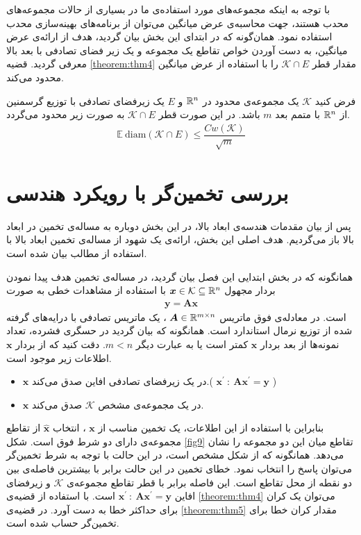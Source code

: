 با توجه به اینکه مجموعه‌های مورد استفاده‌ی ما در بسیاری از حالات مجموعه‌های محدب هستند، جهت محاسبه‌ی عرض میانگین می‌توان از برنامه‌های بهینه‌سازی محدب استفاده نمود.
همان‌گونه که در ابتدای این بخش بیان گردید، هدف از ارائه‌ی عرض میانگین، به دست آوردن خواص تقاطع یک مجموعه و یک زیر فضای تصادفی با بعد بالا معرفی گردید. قضیه
\ref{theorem:thm4}
مقدار قطر 
$\mathcal{K}\cap E$
را با استفاده از عرض میانگین محدود می‌کند.
\begin{theorem}
\label{theorem:thm4}
\cite[قضیه~3.12]{vershynin2015estimation}
فرض کنید 
$\mathcal{K}$
یک مجموعه‌ی محدود در
$\mathbb{R}^{n}$
و 
$E$
یک زیرفضای تصادفی با توزیع گرسمنین از
$\mathbb{R}^{n}$
با متمم بعد 
$m$
باشد. در این صورت قطر 
$\mathcal{K}\cap E$
به صورت زیر محدود می‌گردد.
\begin{align}
\label{eq:eq15}
\mathbb{E}~ \text{diam}\left( \mathcal{K}\cap E \right) \leq \dfrac{C w\left(\mathcal{K}\right)}{\sqrt{m} }
\end{align}

\end{theorem} 

\section{بررسی تخمین‌گر با رویکرد هندسی}
پس از بیان مقدمات هندسه‌ی ابعاد بالا، در این بخش دوباره به مساله‌ی تخمین در ابعاد بالا باز می‌گردیم. هدف اصلی این بخش، ارائه‌ی یک شهود از مساله‌ی تخمین ابعاد بالا با استفاده از مطالب بیان شده است.

همانگونه که در بخش ابتدایی این فصل بیان گردید، در مساله‌ی تخمین هدف پیدا نمودن بردار مجهول
$\bm{x} \in \mathcal{K} \subseteq \mathbb{R}^{n}$
با استفاده از مشاهدات خطی به صورت 
\begin{align}
\label{eq:eq16}
\bm{y} = \bm{A}\bm{x}
\end{align} 
است. در معادله‌ی فوق ماتریس
$\bm{A}\in \mathbb{R}^{m\times n}$
، یک ماتریس تصادفی با درایه‌های گرفته شده از توزیع نرمال استاندارد است. همانگونه که بیان گردید در حسگری فشرده، تعداد نمونه‌ها از بعد بردار 
$\bm{x}$
کمتر است یا به عبارت دیگر 
$m<n$.
دقت کنید که از بردار 
$\bm{x}$
اطلاعات زیر موجود است.
\begin{itemize}
\item{
$\bm{x}$
در یک زیرفضای تصادفی افاین
صدق می‌کند.(
$\bm{x}^{\prime}~:~ \bm{A}\bm{x}^{\prime}=\bm{y}$
)
}
\item{
$\bm{x}$
در یک مجموعه‌ی مشخص
$\mathcal{K}$
صدق می‌کند.
}
\end{itemize}

بنابراین با استفاده از این اطلاعات، یک تخمین مناسب از 
$\bm{x}$
، انتخاب
$\hat{\bm{x}}$
از تقاطع مجموعه‌ی دارای دو شرط فوق است. شکل
\ref{fig9}
تقاطع میان این دو مجموعه را نشان می‌دهد. همانگونه که از شکل مشخص است، در این حالت با توجه به شرط تخمین‌گر می‌توان پاسخ را انتخاب نمود. خطای تخمین در این حالت برابر با بیشترین فاصله‌ی بین دو نقطه از محل تقاطع است. این فاصله برابر با قطر تقاطع مجموعه‌ی
$\mathcal{K}$
و زیرفضای افاین
$\bm{x}^{\prime}~:~ \bm{A}\bm{x}^{\prime}=\bm{y}$
است. با استفاده از قضیه‌ی
\eqref{theorem:thm4}
می‌توان یک کران برای حداکثر خطا به دست آورد. در قضیه‌ی
\eqref{theorem:thm5}
مقدار کران خطا برای تخمین‌گر حساب شده است.


